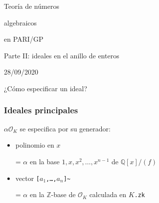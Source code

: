 \documentclass{beamer}
\newcommand{\ZZ}{\mathbb{Z}}
\newcommand{\QQ}{\mathbb{Q}}
\renewcommand{\O}{\mathcal{O}}
\begin{document}

\begin{frame}[noframenumbering]
  \headingfont
  \begin{center}
    {\huge Teoría de números

      algebraicos

      en PARI/GP

    }

    \vspace{3em}

    {\large Parte II: ideales en el anillo de enteros}

    \vspace{3em}

    28/09/2020

  \end{center}
\end{frame}


\begin{frame}[plain]
  \headingfont

  \begin{center}
    {\huge ¿Cómo especificar un ideal?}
  \end{center}
\end{frame}


\begin{frame}
  \frametitle{Ideales principales}

  $\alpha\O_K$ se especifica por su generador:

  \begin{itemize}
  \item polinomio en $x$

    = $\alpha$ en la base $1,x,x^2,\ldots,x^{n-1}$ de $\QQ[x]/(f)$

  \item vector \texttt{[$a_1$,\ldots,$a_n$]\textasciitilde}

    = $\alpha$ en la $\ZZ$-base de $\O_K$ calculada en \texttt{$K$.zk}
  \end{itemize}

\end{frame}

\end{document}
